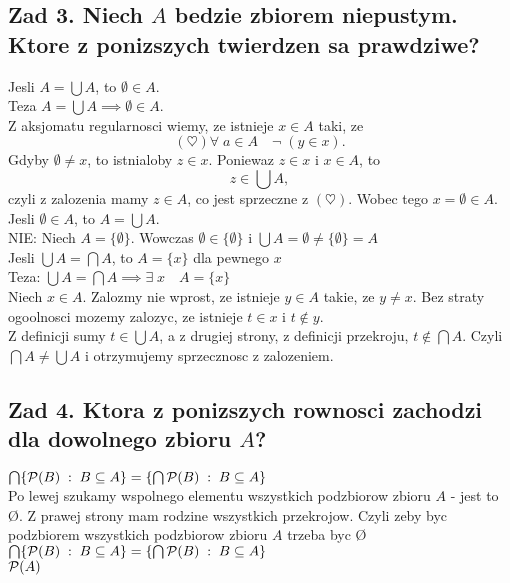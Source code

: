 \documentclass{article}
\begin{document}
\subsection*{Zad 3. Niech $A$ bedzie zbiorem niepustym. Ktore z ponizszych twierdzen sa prawdziwe?}
    {\large\color{tit}Jesli $A=\bigcup A$, to $\emptyset\in A$.}\medskip\\
    Teza $A=\bigcup A\implies\emptyset\in A$.\medskip\\
    Z aksjomatu regularnosci wiemy, ze istnieje $x\in A$ taki, ze
    $$(\heartsuit)\forall\;a\in A\quad\neg\;(y\in x).$$
    Gdyby $\emptyset\neq x$, to istnialoby $z\in x$. Poniewaz $z\in x$ i $x\in A$, to $$z\in\bigcup A,$$
    czyli z zalozenia mamy $z\in A$, co jest sprzeczne z $(\heartsuit)$. Wobec tego $x=\emptyset\in A$.\bigskip\\
    {\large\color{tit}Jesli $\emptyset\in A$, to $A=\bigcup A$.}\medskip\\
    NIE: Niech $A=\{\emptyset\}$. Wowczas $\emptyset\in \{\emptyset\}$ i $\bigcup A=\emptyset\neq\{\emptyset\}=A$\bigskip\\
    {\large\color{tit}Jesli $\bigcup A=\bigcap A$, to $A=\{x\}$ dla pewnego $x$}\medskip\\
    Teza: $\bigcup A=\bigcap A \implies \exists\;x\quad A=\{x\}$\medskip\\
    Niech $x\in A$. Zalozmy nie wprost, ze istnieje $y\in A$ takie, ze $y\neq x$. Bez straty ogoolnosci mozemy zalozyc, ze istnieje $t\in x$ i $t\notin y$.\smallskip\\
    Z definicji sumy $t\in \bigcup A$, a z drugiej strony, z definicji przekroju, $t\notin \bigcap A$. Czyli $\bigcap A\neq \bigcup A$ i otrzymujemy sprzecznosc z zalozeniem.
\subsection*{Zad 4. Ktora z ponizszych rownosci zachodzi dla dowolnego zbioru $A$?}
    {\large\color{tit}$\bigcap\{\mathcal{P}(B)\;:\;B\subseteq A\}=\{\bigcap\mathcal{P}(B)\;:\;B\subseteq A\}$}\medskip\\
    Po lewej szukamy wspolnego elementu wszystkich podzbiorow zbioru $A$ - jest to \O. Z prawej strony mam rodzine wszystkich przekrojow. Czyli zeby byc podzbiorem wszystkich podzbiorow zbioru $A$ trzeba byc \O\bigskip\\
    {\large\color{tit}$\bigcap\{\mathcal{P}(B)\;:\;B\subseteq A\}=\{\bigcap\mathcal{P}(B)\;:\;B\subseteq A\}$}
    \medskip\\
    $\mathcal{P}(A)$
\end{document}
